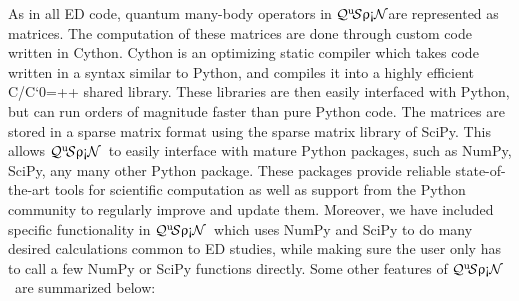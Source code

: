 \documentclass{SciPost}
\newcommand\0{\scalebox{-1}[1]{0}}
\let\svttfamily\ttfamily
\renewcommand\ttfamily{\svttfamily\catcode`0=\active }
\renewcommand\texttt{\bgroup\ttfamily\texttthelp}
\def\texttthelp#1{#1\egroup}
\newcommand{\qspin}{$\mathcal{Q}^{\mathrm{u}}\!\mathcal{S}\uprho\mathrm{\text{\textexclamdown}}\mathcal{N}$}
\begin{document}
As in all ED code, quantum many-body operators in \qspin are represented as matrices. The computation of these matrices are done through custom code written in Cython. Cython is an optimizing static compiler which takes code written in a syntax similar to Python, and compiles it into a highly efficient C/C\texttt{++} shared library. These libraries are then easily interfaced with Python, but can run orders of magnitude faster than pure Python code\cite{Cython}. The matrices are stored in a sparse matrix format using the sparse matrix library of SciPy\cite{SciPy_package}. This allows \qspin\ to easily interface with mature Python packages, such as NumPy, SciPy, any many other Python package. These packages provide reliable state-of-the-art tools for scientific computation as well as support from the Python community to regularly improve and update them\cite{NumPy,Python_computing_1,Python_computing_2,SciPy_package}. Moreover, we have included specific functionality in \qspin\ which uses NumPy and SciPy to do many desired calculations common to ED studies, while making sure the user only has to call a few NumPy or SciPy functions directly. Some other features of \qspin\ are summarized below:
\end{document}
